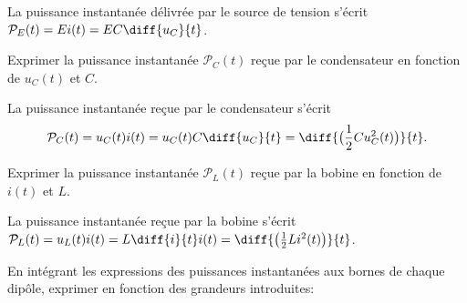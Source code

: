 
\begin{corrige}
La puissance instantanée délivrée par le source de tension s'écrit $\mathcal{P}_E(t)=Ei(t)=EC\diff{u_C}{t}$.
\end{corrige}




\begin{enonce}
Exprimer la puissance instantanée $\mathcal{P}_C(t)$ reçue par le condensateur en fonction de $u_C(t)$ et $C$. 

\end{enonce}


\begin{corrige}
La puissance instantanée reçue par le condensateur s'écrit 
\[
\mathcal{P}_C(t)=u_C(t)i(t)=u_C(t)C\diff{u_C}{t}=\diff{\big(\frac{1}{2}Cu_C^2(t)\big)}{t}.
\]
\end{corrige}




\begin{enonce}
Exprimer la puissance instantanée $\mathcal{P}_L(t)$ reçue par la bobine en fonction de $i(t)$ et $L$. 

\end{enonce}


\begin{corrige}
La puissance instantanée reçue par la bobine s'écrit $\mathcal{P}_L(t)=u_L(t)i(t)=L\diff{i}{t}i(t)=\diff{\big(\frac{1}{2}Li^2(t)\big)}{t}$.
\end{corrige}


\bigskip

En intégrant les expressions des puissances instantanées aux bornes de chaque dipôle, exprimer en fonction des grandeurs introduites:



